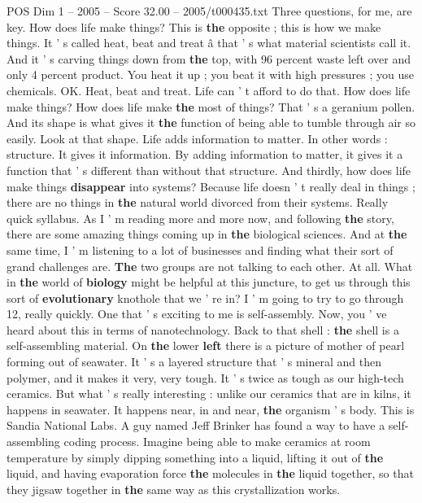 \begin{textsample}{POS Dim 1 – 2005 – Score 32.00 – 2005/t000435.txt}
Three questions, for me, are key.
How does life make things?
This is \textbf{the} opposite ; this is how we make things.
It ' s called heat, beat and treat â that ' s what material scientists call it.
And it ' s carving things down from \textbf{the} top, with 96 percent waste left over and only 4 percent product.
You heat it up ; you beat it with high pressures ; you use chemicals.
OK.
Heat, beat and treat.
Life can ' t afford to do that.
How does life make things?
How does life make \textbf{the} most of things?
That ' s a geranium pollen.
And its shape is what gives it \textbf{the} function of being able to tumble through air so easily.
Look at that shape.
Life adds information to matter.
In other words : structure.
It gives it information.
By adding information to matter, it gives it a function that ' s different than without that structure.
And thirdly, how does life make things \textbf{disappear} into systems?
Because life doesn ' t really deal in things ; there are no things in \textbf{the} natural world divorced from their systems.
Really quick syllabus.
As I ' m reading more and more now, and following \textbf{the} story, there are some amazing things coming up in \textbf{the} biological sciences.
And at \textbf{the} same time, I ' m listening to a lot of businesses and finding what their sort of grand challenges are. \textbf{The} two groups are not talking to each other.
At all.
What in \textbf{the} world of \textbf{biology} might be helpful at this juncture, to get us through this sort of \textbf{evolutionary} knothole that we ' re in?
I ' m going to try to go through 12, really quickly.
One that ' s exciting to me is self-assembly.
Now, you ' ve heard about this in terms of nanotechnology.
Back to that shell : \textbf{the} shell is a self-assembling material.
On \textbf{the} lower \textbf{left} there is a picture of mother of pearl forming out of seawater.
It ' s a layered structure that ' s mineral and then polymer, and it makes it very, very tough.
It ' s twice as tough as our high-tech ceramics.
But what ' s really interesting : unlike our ceramics that are in kilns, it happens in seawater.
It happens near, in and near, \textbf{the} organism ' s body.
This is Sandia National Labs.
A guy named Jeff Brinker has found a way to have a self- assembling coding process.
Imagine being able to make ceramics at room temperature by simply dipping something into a liquid, lifting it out of \textbf{the} liquid, and having evaporation force \textbf{the} molecules in \textbf{the} liquid together, so that they jigsaw together in \textbf{the} same way as this crystallization works.

\end{textsample}
